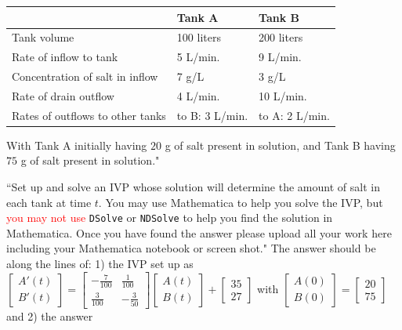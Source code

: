 \documentclass[11pt]{article}
\begin{document}
\begin{enumerate}
				\begin{table}[htbp]\centering
  				\begin{tabular}{|l|l|l|}
    					\hline
          					& Tank A & Tank B \\
    					\hline
   						 Tank volume & 100 liters & 200 liters \\
   					 \hline
  					  	Rate of inflow
						to tank & 5 L/min. & 9 L/min. \\
    					\hline
    						Concentration of 
						salt in inflow & 7 g/L & 3 g/L \\
    					\hline
    						Rate of drain outflow & 4 L/min. & 10 L/min. \\
   					\hline
						Rates of outflows 
						to other tanks & to B: 3 L/min. & to A: 2 L/min. \\
    					\hline
    					
    				\end{tabular}
			\end{table}
		With Tank A initially having $20$ g of salt present in solution, and Tank B having $75$ g of salt present in solution."
		
		``Set up and solve an IVP whose solution will determine the amount of salt in each tank at time $t$. You may use Mathematica to help you solve the IVP, but \textcolor{red}{you may not use} \texttt{DSolve} or \texttt{NDSolve} to help you find the solution in Mathematica. Once you have found the answer please upload all your work here including your Mathematica notebook or screen shot." The answer should be along the lines of: 1) the IVP set up as \(\begin{bmatrix}A'(t) \\ B'(t) \end{bmatrix}=\begin{bmatrix} -\frac{7}{100} & \frac{1}{100} \\[.5em] \frac{3}{100} & -\frac{3}{50} \end{bmatrix}\begin{bmatrix}A(t) \\ B(t) \end{bmatrix}+\begin{bmatrix} 35 \\ 27 \end{bmatrix}\)	with \(\begin{bmatrix} A(0) \\ B(0) \end{bmatrix}=\begin{bmatrix} 20 \\ 75 \end{bmatrix}\) and 2) the answer		
		

\end{enumerate}
\end{document}
